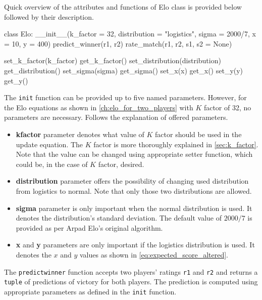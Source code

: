 Quick overview of the attributes and functions of Elo class is provided below followed by their description.

\begin{python}
class Elo:
	__init__(k_factor = 32, distribution = "logistics", sigma = 2000/7, x = 10, y = 400)
	predict_winner(r1, r2)
	rate_match(r1, r2, s1, s2 = None)
	
	set_k_factor(k_factor)
	get_k_factor()
	set_distribution(distribution)
	get_distribution()
	set_sigma(sigma)
	get_sigma()
	set_x(x)
	get_x()
	set_y(y)
	get_y()
\end{python}

\noindent The \texttt{\textunderscore \textunderscore init\textunderscore \textunderscore} function can be provided up to five named parameters. However, for the Elo equations as shown in \autoref{ch:elo_for_two_players} with $K$ factor of 32, no parameters are necessary. Follows the explanation of offered parameters.

\begin{itemize}
\item \textbf{k\textunderscore factor} parameter denotes what value of $K$ factor should be used in the update equation. The $K$ factor is more thoroughly explained in \ref{sec:k_factor}. Note that the value can be changed using appropriate setter function, which could be, in the case of $K$ factor, desired.

\item \textbf{distribution} parameter offers the possibility of changing used distribution from logistics to normal. Note that only those two distributions are allowed.

\item \textbf{sigma} parameter is only important when the normal distribution is used. It denotes the distribution's standard deviation. The default value of $2000/7$ is provided as per Arpad Elo's original algorithm.

\item \textbf{x} and \textbf{y} parameters are only important if the logistics distribution is used. It denotes the $x$ and $y$ values as shown in \eqref{eq:expected_score_altered}.
\end{itemize}

\noindent The \texttt{predict\textunderscore winner} function accepts two players' ratings \texttt{r1} and \texttt{r2} and returns a \texttt{tuple} of predictions of victory for both players. The prediction is computed using appropriate parameters as defined in the \texttt{\textunderscore \textunderscore init\textunderscore \textunderscore} function.

